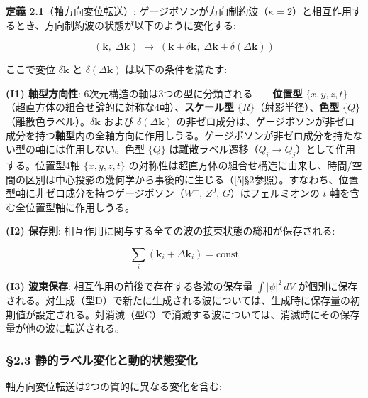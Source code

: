 \documentclass[
  a4paper,11pt]{ltjsarticle}
\theoremstyle{definition}
\theoremstyle{remark}
\begin{document}
\textbf{定義 2.1}（軸方向変位転送）:
ゲージボソンが方向制約波（\(\kappa = 2\)）と相互作用するとき、方向制約波の状態が以下のように変化する:

\[(\mathbf{k},\; \Delta\mathbf{k}) \;\longrightarrow\; (\mathbf{k} + \delta\mathbf{k},\; \Delta\mathbf{k} + \delta(\Delta\mathbf{k}))\]

ここで変位 \(\delta\mathbf{k}\) と \(\delta(\Delta\mathbf{k})\)
は以下の条件を満たす:

\textbf{(I1) 軸型方向性}:
6次元構造の軸は3つの型に分類される------\textbf{位置型}
\(\{x, y, z, t\}\)（超直方体の組合せ論的に対称な4軸）、\textbf{スケール型}
\(\{R\}\)（射影半径）、\textbf{色型}
\(\{Q\}\)（離散色ラベル）。\(\delta\mathbf{k}\) および
\(\delta(\Delta\mathbf{k})\)
の非ゼロ成分は、ゲージボソンが非ゼロ成分を持つ\textbf{軸型}内の全軸方向に作用しうる。ゲージボソンが非ゼロ成分を持たない型の軸には作用しない。色型
\(\{Q\}\) は離散ラベル遷移（\(Q_i \to Q_j\)）として作用する。位置型4軸
\(\{x, y, z, t\}\)
の対称性は超直方体の組合せ構造に由来し、時間/空間の区別は中心投影の幾何学から事後的に生じる（{[}5{]}§2参照）。すなわち、位置型軸に非ゼロ成分を持つゲージボソン（\(W^{\pm}\),
\(Z^0\), \(G\)）はフェルミオンの \(t\) 軸を含む全位置型軸に作用しうる。

\textbf{(I2) 保存則}:
相互作用に関与する全ての波の接束状態の総和が保存される:

\[\sum_i (\mathbf{k}_i + \Delta\mathbf{k}_i) = \text{const}\]

\textbf{(I3) 波束保存}: 相互作用の前後で存在する各波の保存量
\(\int |\psi|^2 \, dV\)
が個別に保存される。対生成（型D）で新たに生成される波については、生成時に保存量の初期値が設定される。対消滅（型C）で消滅する波については、消滅時にその保存量が他の波に転送される。

\subsubsection{§2.3
静的ラベル変化と動的状態変化}\label{ux9759ux7684ux30e9ux30d9ux30ebux5909ux5316ux3068ux52d5ux7684ux72b6ux614bux5909ux5316}

軸方向変位転送は2つの質的に異なる変化を含む:
\end{document}
